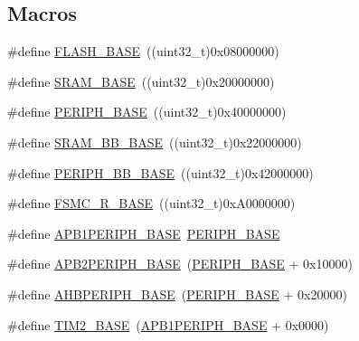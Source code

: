 \subsection*{Macros}
\begin{DoxyCompactItemize}
\item 
\#define \hyperlink{group___peripheral__memory__map_ga23a9099a5f8fc9c6e253c0eecb2be8db}{F\+L\+A\+S\+H\+\_\+\+B\+A\+SE}~((uint32\+\_\+t)0x08000000)
\item 
\#define \hyperlink{group___peripheral__memory__map_ga05e8f3d2e5868754a7cd88614955aecc}{S\+R\+A\+M\+\_\+\+B\+A\+SE}~((uint32\+\_\+t)0x20000000)
\item 
\#define \hyperlink{group___peripheral__memory__map_ga9171f49478fa86d932f89e78e73b88b0}{P\+E\+R\+I\+P\+H\+\_\+\+B\+A\+SE}~((uint32\+\_\+t)0x40000000)
\item 
\#define \hyperlink{group___peripheral__memory__map_gad3548b6e2f017f39d399358f3ac98454}{S\+R\+A\+M\+\_\+\+B\+B\+\_\+\+B\+A\+SE}~((uint32\+\_\+t)0x22000000)
\item 
\#define \hyperlink{group___peripheral__memory__map_gaed7efc100877000845c236ccdc9e144a}{P\+E\+R\+I\+P\+H\+\_\+\+B\+B\+\_\+\+B\+A\+SE}~((uint32\+\_\+t)0x42000000)
\item 
\#define \hyperlink{group___peripheral__memory__map_gaddf0e199dccba83272b20c9fb4d3aaed}{F\+S\+M\+C\+\_\+\+R\+\_\+\+B\+A\+SE}~((uint32\+\_\+t)0x\+A0000000)
\item 
\#define \hyperlink{group___peripheral__memory__map_ga45666d911f39addd4c8c0a0ac3388cfb}{A\+P\+B1\+P\+E\+R\+I\+P\+H\+\_\+\+B\+A\+SE}~\hyperlink{group___peripheral__memory__map_ga9171f49478fa86d932f89e78e73b88b0}{P\+E\+R\+I\+P\+H\+\_\+\+B\+A\+SE}
\item 
\#define \hyperlink{group___peripheral__memory__map_ga25b99d6065f1c8f751e78f43ade652cb}{A\+P\+B2\+P\+E\+R\+I\+P\+H\+\_\+\+B\+A\+SE}~(\hyperlink{group___peripheral__memory__map_ga9171f49478fa86d932f89e78e73b88b0}{P\+E\+R\+I\+P\+H\+\_\+\+B\+A\+SE} + 0x10000)
\item 
\#define \hyperlink{group___peripheral__memory__map_ga92eb5d49730765d2abd0f5b09548f9f5}{A\+H\+B\+P\+E\+R\+I\+P\+H\+\_\+\+B\+A\+SE}~(\hyperlink{group___peripheral__memory__map_ga9171f49478fa86d932f89e78e73b88b0}{P\+E\+R\+I\+P\+H\+\_\+\+B\+A\+SE} + 0x20000)
\item 
\#define \hyperlink{group___peripheral__memory__map_ga00d0fe6ad532ab32f0f81cafca8d3aa5}{T\+I\+M2\+\_\+\+B\+A\+SE}~(\hyperlink{group___peripheral__memory__map_ga45666d911f39addd4c8c0a0ac3388cfb}{A\+P\+B1\+P\+E\+R\+I\+P\+H\+\_\+\+B\+A\+SE} + 0x0000)

\end{DoxyCompactItemize}
